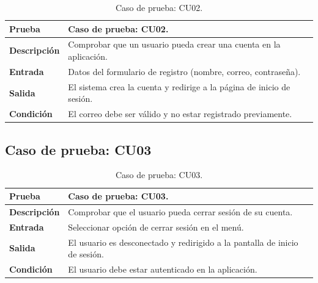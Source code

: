 \begin{table}[ht]
\centering
\renewcommand{\arraystretch}{1.3}
\begin{tabular}{|p{3cm}|p{12cm}|}
\hline
\rowcolor[RGB]{191,191,191}
\textbf{Prueba} & Caso de prueba: CU02. \\
\hline
\textbf{Descripción} \cellcolor[RGB]{217,217,217} & Comprobar que un usuario pueda crear una cuenta en la aplicación. \\
\hline
\textbf{Entrada} \cellcolor[RGB]{217,217,217} & Datos del formulario de registro (nombre, correo, contraseña). \\
\hline
\textbf{Salida} \cellcolor[RGB]{217,217,217} & El sistema crea la cuenta y redirige a la página de inicio de sesión. \\
\hline
\textbf{Condición} \cellcolor[RGB]{217,217,217} & El correo debe ser válido y no estar registrado previamente. \\
\hline
\end{tabular}
\caption{Caso de prueba: CU02.}
\label{tab:cu02_black_test}
\end{table}


\subsection{Caso de prueba: CU03}

\begin{table}[ht]
\centering
\renewcommand{\arraystretch}{1.3}
\begin{tabular}{|p{3cm}|p{12cm}|}
\hline
\rowcolor[RGB]{191,191,191}
\textbf{Prueba} & Caso de prueba: CU03. \\
\hline
\textbf{Descripción} \cellcolor[RGB]{217,217,217} & Comprobar que el usuario pueda cerrar sesión de su cuenta. \\
\hline
\textbf{Entrada} \cellcolor[RGB]{217,217,217} & Seleccionar opción de cerrar sesión en el menú. \\
\hline
\textbf{Salida} \cellcolor[RGB]{217,217,217} & El usuario es desconectado y redirigido a la pantalla de inicio de sesión. \\
\hline
\textbf{Condición} \cellcolor[RGB]{217,217,217} & El usuario debe estar autenticado en la aplicación. \\
\hline
\end{tabular}
\caption{Caso de prueba: CU03.}
\label{tab:cu03_black_test}
\end{table}

